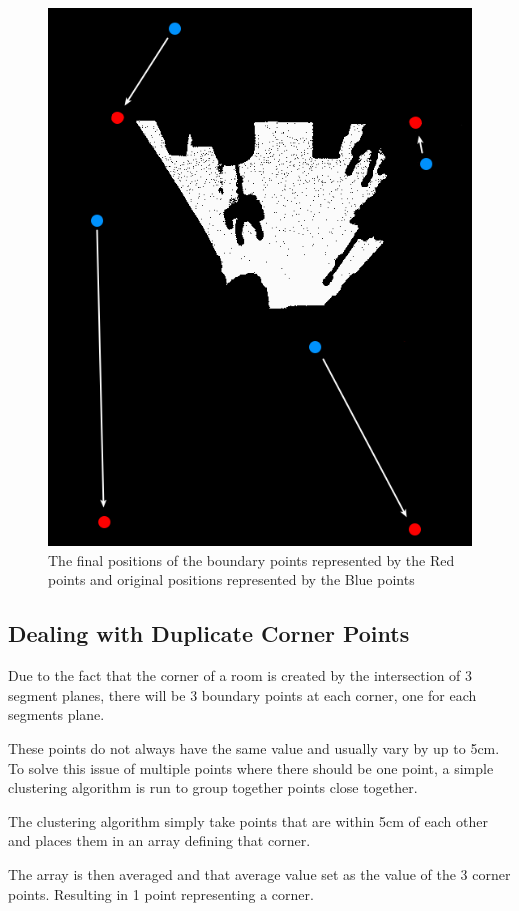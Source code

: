 			\begin{figure}[H]
				\centering
				\includegraphics[width=0.6\linewidth]{"Includes/images/Project Points/F-5"}
				\caption{The final positions of the boundary points represented by the Red points and original positions represented by the Blue points}
				\label{fig:F-5}
			\end{figure}
			
		\subsection{Dealing with Duplicate Corner Points}
			Due to the fact that the corner of a room is created by the intersection of 3 segment planes, there will be 3 boundary points at each corner, one for each segments plane.
			
			These points do not always have the same value and usually vary by up to 5cm. To solve this issue of multiple points where there should be one point, a simple clustering algorithm is run to group together points close together.
			
			The clustering algorithm simply take points that are within 5cm of each other and places them in an array defining that corner.
			
			The array is then averaged and that average value set as the value of the 3 corner points. Resulting in 1 point representing a corner.
			
